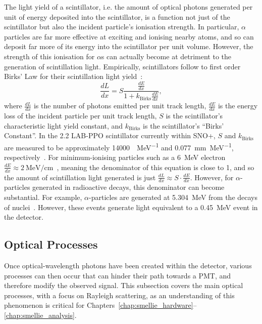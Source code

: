 The light yield of a scintillator, i.e. the amount of optical photons generated per unit of energy deposited into the scintillator, is a function not just of the scintillator but also the incident particle's ionisation strength. In particular, $\alpha$ particles are far more effective at exciting and ionising nearby atoms, and so can deposit far more of its energy into the scintillator per unit volume. However, the strength of this ionisation for $\alpha$s can actually become at detriment to the generation of scintillation light. Empirically, scintillators follow to first order Birks' Law for their scintillation light yield~\cite{birksChapterScintillationProcess1967a}: %
\begin{equation}
    \frac{dL}{dx} = S\frac{\frac{dE}{dx}}{1+k_{\mathrm{Birks}}\frac{dE}{dx}},
\end{equation}
where $\frac{dL}{dx}$ is the number of photons emitted per unit track length, $\frac{dE}{dx}$ is the energy loss of the incident particle per unit track length, $S$ is the scintillator's characteristic light yield constant, and $k_{\mathrm{Birks}}$ is the scintillator's ``Birks' Constant''. In the \SI{2.2}{\gpl} LAB-PPO scintillator currently within SNO+, $S$ and $k_{\mathrm{Birks}}$ are measured to be approximately \SI{14000}{\gamma\per\MeV} and \SI{0.077}{\mm\per\MeV}, respectively~\cite{riccettoRATOptics2g2022}. %
For minimum-ionising particles such as a \SI{6}{\MeV} electron $\frac{dE}{dx}\approx\SI{2}{\MeV\per\cm}$~\cite{workmanReviewParticlePhysics2022a}, %
meaning the denominator of this equation is close to 1, and so the amount of scintillation light generated is just $\frac{dL}{dx} \approx S\cdot\frac{dE}{dx}$. However, for $\alpha$-particles generated in radioactive decays, this denominator can become substantial. For example, $\alpha$-particles are generated at \SI{5.304}{\MeV} from the decays of  nuclei~\cite{kondevNuclearDataSheets2008}. However, these events generate light equivalent to a \SI{0.45}{\MeV} event in the detector.


\subsection{Optical Processes}\label{sec:optical_processes}
Once optical-wavelength photons have been created within the detector, various processes can then occur that can hinder their path towards a PMT, and therefore modify the observed signal. This subsection covers the main optical processes, with a focus on Rayleigh scattering, as an understanding of this phenomenon is critical for Chapters~\ref{chap:smellie_hardware}--\ref{chap:smellie_analysis}.


